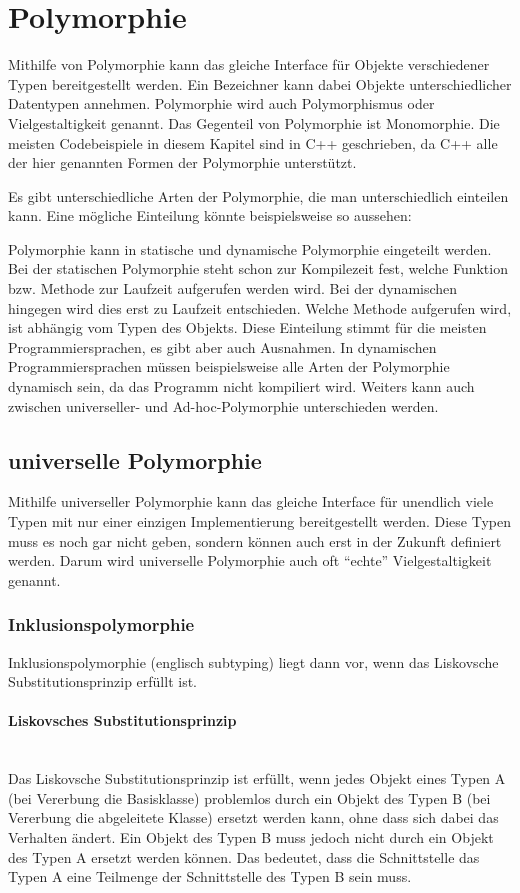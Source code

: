 \section{Polymorphie}
	Mithilfe von Polymorphie kann das gleiche Interface für Objekte verschiedener Typen bereitgestellt werden. Ein Bezeichner
	kann dabei Objekte unterschiedlicher Datentypen annehmen. Polymorphie wird auch Polymorphismus oder Vielgestaltigkeit
	genannt. Das Gegenteil von Polymorphie ist Monomorphie. Die meisten Codebeispiele in diesem Kapitel sind in C++
	geschrieben, da C++ alle der hier genannten Formen der Polymorphie unterstützt.
	
	Es gibt unterschiedliche Arten der Polymorphie, die man unterschiedlich einteilen kann. Eine mögliche Einteilung könnte
	beispielsweise so aussehen:
	
	
	
	Polymorphie kann in statische und dynamische Polymorphie eingeteilt werden. Bei der statischen Polymorphie steht schon
	zur Kompilezeit fest, welche Funktion bzw. Methode zur Laufzeit aufgerufen werden wird. Bei der dynamischen hingegen
	wird dies erst zu Laufzeit entschieden. Welche Methode aufgerufen wird, ist abhängig vom Typen des Objekts.
	Diese Einteilung stimmt für die meisten Programmiersprachen, es gibt aber auch Ausnahmen. In dynamischen
	Programmiersprachen müssen beispielsweise alle Arten der Polymorphie dynamisch sein, da das Programm nicht kompiliert
	wird.
	Weiters kann auch zwischen universeller- und Ad-hoc-Polymorphie unterschieden werden.

	\subsection{universelle Polymorphie}
		Mithilfe universeller Polymorphie kann das gleiche Interface für unendlich viele Typen mit nur einer einzigen Implementierung bereitgestellt werden. Diese
		Typen muss es noch gar nicht geben, sondern können auch erst in der Zukunft definiert werden. Darum wird
		universelle Polymorphie auch oft ``echte'' Vielgestaltigkeit genannt.
		
		\subsubsection{Inklusionspolymorphie}
			Inklusionspolymorphie (englisch subtyping) liegt dann vor, wenn das Liskovsche Substitutionsprinzip erfüllt ist.
			
			\paragraph{Liskovsches Substitutionsprinzip}\mbox{}\\
				Das Liskovsche Substitutionsprinzip ist erfüllt, wenn jedes Objekt eines Typen A (bei Vererbung die
				Basisklasse) problemlos durch ein Objekt des Typen B (bei Vererbung die abgeleitete Klasse) ersetzt werden
				kann, ohne dass sich dabei das Verhalten ändert. Ein Objekt des Typen B muss jedoch nicht durch ein Objekt
				des Typen A ersetzt werden können. Das bedeutet, dass die Schnittstelle das Typen A eine Teilmenge der
				Schnittstelle des Typen B sein muss.
		
